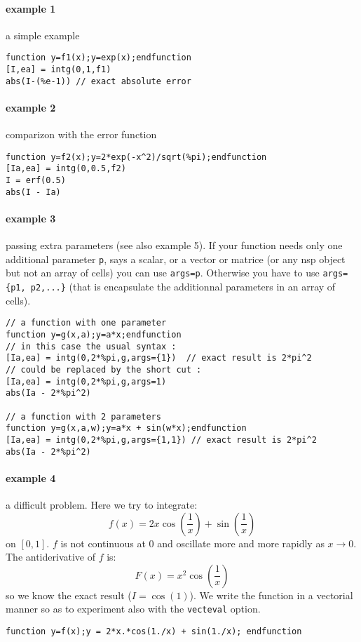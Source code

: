 \begin{examples}
  
\paragraph{example 1} a simple example 
\begin{Verbatim}
function y=f1(x);y=exp(x);endfunction
[I,ea] = intg(0,1,f1)
abs(I-(%e-1)) // exact absolute error
\end{Verbatim}
  
\paragraph{example 2} comparizon with the error function
\begin{Verbatim}
function y=f2(x);y=2*exp(-x^2)/sqrt(%pi);endfunction
[Ia,ea] = intg(0,0.5,f2)
I = erf(0.5)
abs(I - Ia)
\end{Verbatim}
  
\paragraph{example 3} passing extra parameters (see also example 5). 
If your function needs
only one additional parameter \verb+p+, says a scalar, or a vector or matrice 
(or any nsp object but not an array of cells) you can use \verb+args=p+. 
Otherwise you have to use  \verb+args={p1, p2,...}+ (that is encapsulate 
the additionnal parameters in an array of cells).
\begin{Verbatim}
// a function with one parameter
function y=g(x,a);y=a*x;endfunction
// in this case the usual syntax :
[Ia,ea] = intg(0,2*%pi,g,args={1})  // exact result is 2*pi^2
// could be replaced by the short cut :
[Ia,ea] = intg(0,2*%pi,g,args=1)
abs(Ia - 2*%pi^2)

// a function with 2 parameters
function y=g(x,a,w);y=a*x + sin(w*x);endfunction
[Ia,ea] = intg(0,2*%pi,g,args={1,1}) // exact result is 2*pi^2
abs(Ia - 2*%pi^2)
\end{Verbatim}

\paragraph{example 4} a difficult problem. Here we try to integrate:
$$
    f(x) = 2 x \cos \left(\frac{1}{x}\right) +  \sin \left(\frac{1}{x}\right)
$$ 
on $[0,1]$. $f$ is not continuous at $0$ and oscillate more and more
rapidly as $x \rightarrow 0$. The antiderivative of $f$
is:
$$
    F(x) = x^2  \cos \left(\frac{1}{x}\right)
$$
so we know the exact result ($I=\cos(1)$). We write the function in a vectorial
manner so as to experiment also with the \verb+vecteval+ option. 
\begin{Verbatim}
function y=f(x);y = 2*x.*cos(1./x) + sin(1./x); endfunction


\end{Verbatim}
\end{examples}
